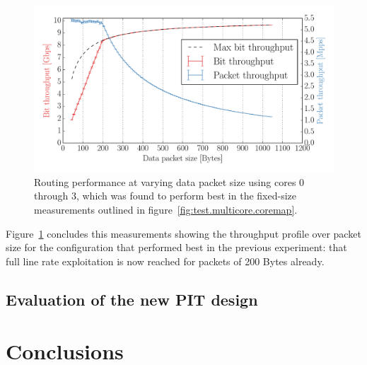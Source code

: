 \documentclass[11pt,a4paper,twoside,titlepage,openany]{book}
\begin{document}
\begin{figure}[tb]
  \begin{center}
    \includegraphics[width=1.0\textwidth]{img/augustus_increasing_len_0xF.pdf}
    \caption[Routing performance at varying data packet for the best multithread configuration.]{Routing performance at varying data packet size using cores 0 through 3, which was found to perform best in the fixed-size measurements outlined in figure~\ref{fig:test.multicore.coremap}.}
    \label{fig:test.multicore.incr_len}
  \end{center}
\end{figure}

Figure~\ref{fig:test.multicore.incr_len} concludes this measurements showing the throughput profile over packet size for the configuration that performed best in the previous experiment: that full line rate exploitation is now reached for packets of 200 Bytes already.

\section{Evaluation of the new PIT design}\label{sec:test.pit}

\todo[inline]{}



\chapter{Conclusions}
\label{chap:conclusions}
\end{document}
